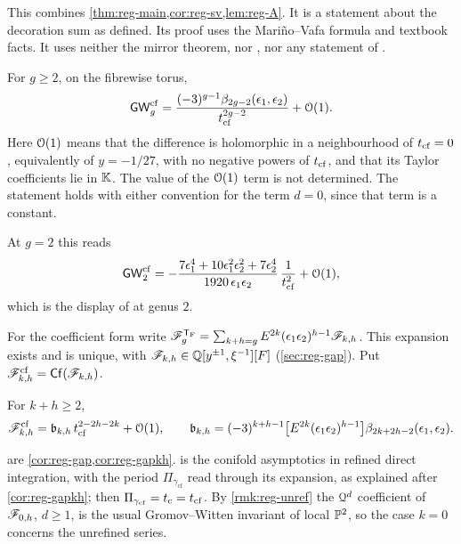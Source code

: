 This combines \cref{thm:reg-main,cor:reg-sv,lem:reg-A}. It is a statement about the decoration sum as defined. Its proof uses the Mari\~no--Vafa formula \cite[eq.~(1)--(3)]{LLZ03} and textbook facts. It uses neither the mirror theorem, nor \cite{Tel12}, nor any statement of \cite{BS}.

\begin{cor}
\label{cor:int-gap}
For $g\geq 2$, on the fibrewise torus,
\[
\mathsf{GW}^{\mathrm{cf}}_g=\frac{(-3)^{g-1}\beta_{2g-2}(\epsilon_1,\epsilon_2)}{t_{\mathrm{cf}}^{2g-2}}+\mathcal{O}(1).
\]
Here $\mathcal{O}(1)$ means that the difference is holomorphic in a neighbourhood of $t_{\mathrm{cf}}=0$, equivalently of $y=-1/27$, with no negative powers of $t_{\mathrm{cf}}$, and that its Taylor coefficients lie in $\mathbb{K}$. The value of the $\mathcal{O}(1)$ term is not determined. The statement holds with either convention for the term $d=0$, since that term is a constant.
\end{cor}

At $g=2$ this reads
\[
\mathsf{GW}^{\mathrm{cf}}_2=-\frac{7\epsilon_1^4+10\epsilon_1^2\epsilon_2^2+7\epsilon_2^4}{1920\,\epsilon_1\epsilon_2}\,\frac{1}{t_{\mathrm{cf}}^2}+\mathcal{O}(1),
\]
which is the display of \cite{BS} at genus $2$. 

For the coefficient form write $\mathscr{F}_g^{\mathsf{T}_{\mathrm{F}}}=\sum_{k+h=g}E^{2k}(\epsilon_1\epsilon_2)^{h-1}\mathscr{F}_{k,h}$. This expansion exists and is unique, with $\mathscr{F}_{k,h}\in\mathbb{Q}[y^{\pm1},\xi^{-1}][F]$ (\cref{sec:reg-gap}). Put $\mathscr{F}^{\mathrm{cf}}_{k,h}=\mathsf{Cf}(\mathscr{F}_{k,h})$.

\begin{cor}[Coefficients]
\label{cor:int-gapkh}
For $k+h\geq 2$,
\[
\mathscr{F}^{\mathrm{cf}}_{k,h}=\mathfrak{b}_{k,h}\,t_{\mathrm{cf}}^{2-2h-2k}+\mathcal{O}(1),\qquad
\mathfrak{b}_{k,h}=(-3)^{k+h-1}\big[E^{2k}(\epsilon_1\epsilon_2)^{h-1}\big]\beta_{2k+2h-2}(\epsilon_1,\epsilon_2).
\]
\end{cor}

 are \cref{cor:reg-gap,cor:reg-gapkh}.  is the conifold asymptotics in refined direct integration, with the period $\Pi_{\gamma_{\mathrm{cf}}}$ read through its expansion, as explained after \cref{cor:reg-gapkh}; then $\Pi_{\gamma_{\mathrm{cf}}}=t_{\mathrm{c}}=t_{\mathrm{cf}}$. By \cref{rmk:reg-unref} the $\mathcal{Q}^d$ coefficient of $\mathscr{F}_{0,h}$, $d\geq 1$, is the usual Gromov--Witten invariant of local $\mathbb{P}^2$, so the case $k=0$ concerns the unrefined series. 

